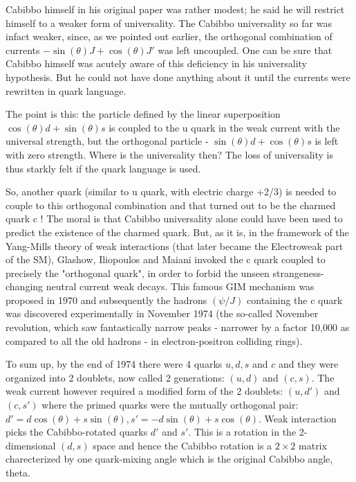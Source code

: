 Cabibbo himself in his original paper was rather modest; he said
he will restrict himself to a weaker form of universality. The
Cabibbo universality so far was infact weaker, since, as we 
pointed out earlier, the orthogonal
combination of currents $-\sin(\theta)J + \cos(\theta)J'$ was left
uncoupled. One can be sure that Cabibbo himself was acutely aware
of this deficiency in his universality hypothesis. But he could
not have done anything about it until the currents were rewritten
in quark language. 

The point is this: the particle defined by the linear superposition
$\cos(\theta) d + \sin(\theta) s$ is coupled to the u quark in
the weak current with the universal strength, but the orthogonal particle 
- $\sin(\theta)d + \cos(\theta)s$ is left with zero strength. Where is
the universality then? The loss of universality is thus starkly 
felt if the quark language is used.
 
So, another quark (similar to u quark, with
electric charge +2/3) is needed to couple to this orthogonal combination
and that turned out to be the charmed quark c ! The moral is that
Cabibbo universality alone could have been used to predict the
existence of the charmed quark. But, as it is, in the framework of
the Yang-Mills theory of weak interactions (that later became the 
Electroweak part of the SM), Glashow, Iliopoulos and Maiani
invoked the c quark coupled to precisely the "orthogonal quark", 
in order to forbid the unseen strangeness-changing
neutral current weak decays. This famous GIM mechanism was proposed
in 1970 and subsequently the hadrons $(\psi/J)$ containing the c quark was 
discovered experimentally in November 1974 (the so-called November
revolution, which saw fantastically narrow peaks - narrower by a factor
10,000 as compared to all the old hadrons - in electron-positron colliding
rings).      
 
To sum up, by the end of 1974 there were 4 quarks $u,d,s$ and $c$ and
they were organized into 2 doublets, now called 2 generations: $(u,d)$ and 
$(c,s)$. The weak current however required a modified form of the 2 doublets:
$(u,d')$ and $(c,s')$ where the primed quarks were the mutually orthogonal
pair: $d'=d \cos(\theta)+ s \sin(\theta),s'= -d \sin(\theta)+ s \cos(\theta)$.
Weak interaction picks the Cabibbo-rotated quarks $d'$ and $s'$. This is
a rotation in the 2-dimensional $(d,s)$ space and hence the Cabibbo
rotation is a $2 \times 2$ matrix charecterized by one quark-mixing angle
which is the original Cabibbo angle, theta.

